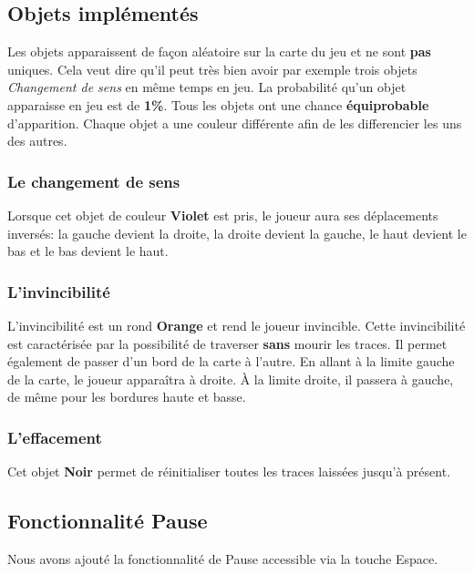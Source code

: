 \documentclass[12pt, french, a4paper]{article}
\begin{document}
  \subsection{Objets implémentés}
  Les objets apparaissent de façon aléatoire sur la carte du jeu et ne sont \textbf{pas} uniques. Cela veut dire qu'il peut très bien avoir par exemple trois objets \textit{Changement de sens} en même temps en jeu. La probabilité qu'un objet apparaisse en jeu est de \textbf{1\%}. Tous les objets ont une chance \textbf{équiprobable} d'apparition.
  \newline
  Chaque objet a une couleur différente afin de les differencier les uns des autres.

  \subsubsection{Le changement de sens}
  Lorsque cet objet de couleur \textbf{Violet} est pris, le joueur aura ses déplacements inversés: la gauche devient la droite, la droite devient la gauche, le haut devient le bas et le bas devient le haut.

  \subsubsection{L'invincibilité}
  L'invincibilité est un rond \textbf{Orange} et rend le joueur invincible. Cette invincibilité est caractérisée par la possibilité de traverser \textbf{sans} mourir les traces. Il permet également de passer d'un bord de la carte à l'autre.
  \newline
  En allant à la limite gauche de la carte, le joueur apparaîtra à droite. À la limite droite, il passera à gauche, de même pour les bordures haute et basse.

  \subsubsection{L'effacement}
  Cet objet \textbf{Noir} permet de réinitialiser toutes les traces laissées jusqu'à présent.

  \subsection{Fonctionnalité Pause}
  Nous avons ajouté la fonctionnalité de Pause accessible via la touche Espace.
\end{document}
